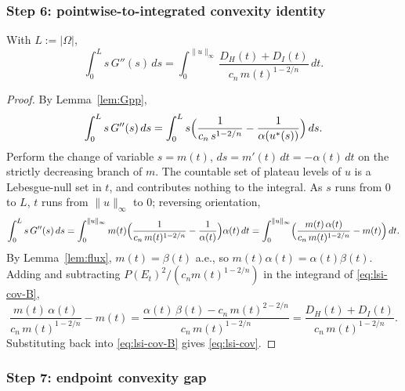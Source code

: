 \subsubsection{Step 6: pointwise-to-integrated convexity identity}
\label{sssec:lsi-cov}

\begin{lemma}\label{lem:cov}\label{lem:lsid:DHDI-psi}
With $L:=|\Omega|$,
\begin{equation}\label{eq:lsi-cov}
   \int_{0}^{L}s\,G''(s)\,ds
   =\int_{0}^{\|u\|_{\infty}}\frac{D_{H}(t)+D_{I}(t)}{c_{n}\,m(t)^{1-2/n}}\,dt.
\end{equation}
\end{lemma}

\begin{proof}
By Lemma~\ref{lem:Gpp},
\begin{equation}\label{eq:lsi-cov-A}
   \int_{0}^{L}s\,G''(s)\,ds
   =\int_{0}^{L}s\Bigl(\frac{1}{c_{n}\,s^{1-2/n}}
      -\frac{1}{\alpha(u^{*}(s))}\Bigr)\,ds.
\end{equation}
Perform the change of variable $s=m(t)$, $ds=m'(t)\,dt=-\alpha(t)\,dt$
on the strictly decreasing branch of $m$. The countable set of plateau
levels of $u$ is a Lebesgue-null set in $t$, and contributes nothing to
the integral. As $s$ runs from $0$ to $L$, $t$ runs from $\|u\|_{\infty}$
to $0$; reversing orientation,
\begin{equation}\label{eq:lsi-cov-B}
   \int_{0}^{L}s\,G''(s)\,ds
   =\int_{0}^{\|u\|_{\infty}}m(t)
     \Bigl(\frac{1}{c_{n}\,m(t)^{1-2/n}}-\frac{1}{\alpha(t)}\Bigr)
     \alpha(t)\,dt
   =\int_{0}^{\|u\|_{\infty}}\Bigl(
        \frac{m(t)\,\alpha(t)}{c_{n}\,m(t)^{1-2/n}}-m(t)\Bigr)\,dt.
\end{equation}
By Lemma~\ref{lem:flux}, $m(t)=\beta(t)$ a.e., so
$m(t)\alpha(t)=\alpha(t)\beta(t)$. Adding and subtracting
$P(E_{t})^{2}/(c_{n}m(t)^{1-2/n})$ in the integrand of
\eqref{eq:lsi-cov-B},
\[
   \frac{m(t)\,\alpha(t)}{c_{n}\,m(t)^{1-2/n}}-m(t)
   =\frac{\alpha(t)\,\beta(t)-c_{n}\,m(t)^{2-2/n}}{c_{n}\,m(t)^{1-2/n}}
   =\frac{D_{H}(t)+D_{I}(t)}{c_{n}\,m(t)^{1-2/n}}.
\]
Substituting back into \eqref{eq:lsi-cov-B} gives \eqref{eq:lsi-cov}.
\end{proof}

\subsubsection{Step 7: endpoint convexity gap}
\label{sssec:lsi-Gamma}

